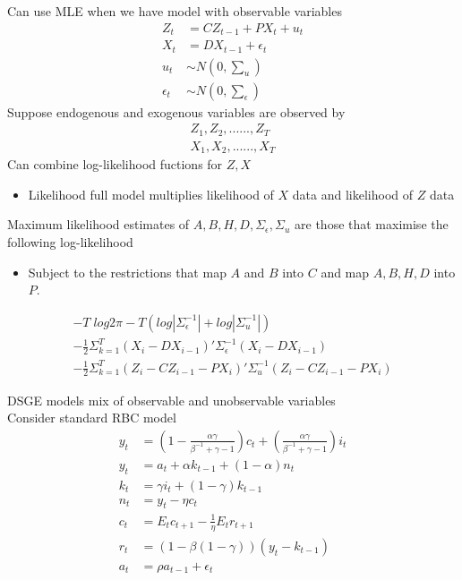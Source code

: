\documentclass{beamer}
\begin{document}
\begin{frame}
  Can use MLE when we have model with observable variables  
\begin{align}  
  Z_t&=CZ_{t-1} + PX_t + u_t\\
  X_t &= DX_{t-1} + \epsilon_t\\
  u_t&\sim N(0,\sum\nolimits_u)\\
  \epsilon_t&\sim N(0,\sum\nolimits_\epsilon)
\end{align}
\medskip
 Suppose endogenous and exogenous variables are observed by
 \begin{align}
   Z_1,Z_2,......,Z_T\\
   X_1,X_2,......,X_T
 \end{align}
 Can combine log-likelihood fuctions for $Z,X$
 \begin{itemize}
  \item Likelihood full model multiplies likelihood of $X$ data and likelihood of $Z$ data  
 \end{itemize} 
\end{frame}

\begin{frame}
 Maximum likelihood estimates of $A,B,H,D,\Sigma_{\epsilon}, \Sigma_u$ are those that maximise the following log-likelihood
\begin{itemize}
  \item Subject to the restrictions that map $A$ and $B$ into $C$ and map $A,B,H,D$ into $P$.  
\end{itemize}
\begin{align}
  -T\;log2\pi - T (log |\Sigma_\epsilon^{-1}| + log |\Sigma_u^{-1}|)\\ \nonumber
  - \frac{1}{2}\Sigma_{k=1}^T(X_i-DX_{i-1})'\Sigma_\epsilon^{-1}(X_i-DX_{i-1})\\ \nonumber
  -\frac{1}{2}\Sigma_{k=1}^T(Z_i-CZ_{i-1}-PX_i)'\Sigma_u^{-1}(Z_i-CZ_{i-1}-PX_i)  \nonumber
\end{align}
\end{frame}

\begin{frame}
  DSGE models mix of observable and unobservable variables\\
  \medskip
  Consider standard RBC model
\begin{align*}
  y_t &= \left(1-\frac{\alpha \gamma}{\beta^{-1}+\gamma -1}\right)c_t +
  \left(\frac{\alpha \gamma}{\beta^{-1}+\gamma-1}\right)i_t\\
  y_t &= a_t +\alpha k_{t-1} + (1-\alpha)n_t\\
  k_t &= \gamma i_t + (1-\gamma)k_{t-1}\\
  n_t &= y_t-\eta c_t\\
  c_t &= E_t c_{t+1} - \frac{1}{\eta}E_t r_{t+1}\\
  r_t &= (1-\beta(1-\gamma))(y_t-k_{t-1})\\
  a_t &= \rho a_{t-1} + \epsilon_t
\end{align*}
\end{frame}
\end{document}
